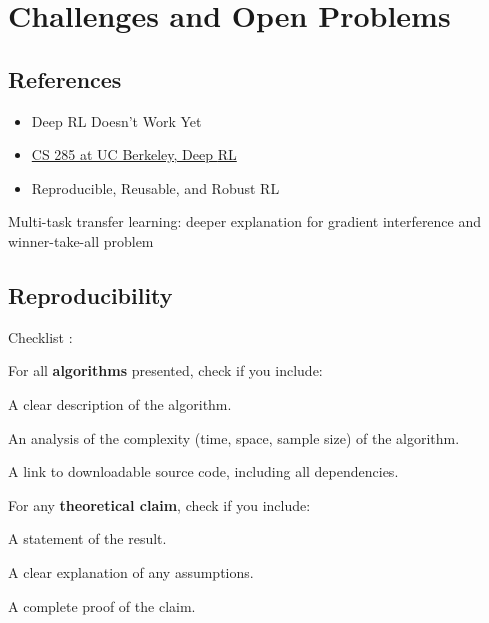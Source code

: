 \chapter{Challenges and Open Problems}

\section{References}
\begin{itemize}
	\item Deep \ac{RL} Doesn't Work Yet \cite{irpan18}
	\item \href{http://rail.eecs.berkeley.edu/deeprlcourse/static/slides/lec-23.pdf}{CS 285 at UC Berkeley, Deep \ac{RL}}
	\item Reproducible, Reusable, and Robust \ac{RL} \cite{pineau2018reproducible}
\end{itemize}
Multi-task transfer learning: deeper explanation for gradient interference and winner-take-all problem

\section{Reproducibility}
Checklist \cite{pineau2018reproducible}:

For all \textbf{algorithms} presented, check if you include:
\begin{todolist}
	\item A clear description of the algorithm.
	\item An analysis of the complexity (time, space, sample size) of the algorithm.
	\item A link to downloadable source code, including all dependencies.
\end{todolist}

For any \textbf{theoretical claim}, check if you include:
\begin{todolist}
	\item A statement of the result.
	\item A clear explanation of any assumptions.
	\item A complete proof of the claim.
\end{todolist}

